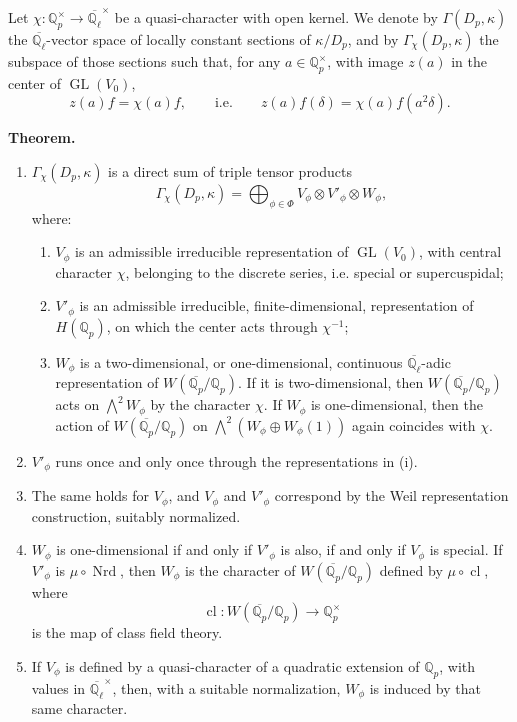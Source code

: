 \documentclass[11pt]{article}
\newcommand{\Qp}{\mathbb{Q}_{p}}
\newcommand{\Ql}{\mathbb{Q}_{\ell}}
\newcommand{\GL}{\operatorname{GL}}
\newcommand{\Nrd}{\operatorname{Nrd}}
\newcommand{\cl}{\operatorname{cl}}
\begin{document}
Let \(\chi:\Qp^\times\to\overline{\Ql}^{\times}\) be a quasi-character with open kernel. We denote by \(\Gamma(D_p,\kappa)\) the \(\overline{\Ql}\)-vector space of locally constant sections of \(\kappa/D_p\), and by \(\Gamma_{\chi}(D_p,\kappa)\) the subspace of those sections such that, for any \(a\in\Qp^\times\), with image \(z(a)\) in the center of \(\GL(V_0)\),
\[
z(a)f=\chi(a)f,\qquad\text{i.e.}\qquad
z(a)f(\delta)=\chi(a)f(a^2\delta).
\]

\textbf{Theorem.}
\begin{enumerate}[label=(\roman*)]
\item \(\Gamma_{\chi}(D_p,\kappa)\) is a direct sum of triple tensor products
\[
\Gamma_{\chi}(D_p,\kappa)=
\bigoplus_{\phi\in\Phi}V_{\phi}\otimes V'_{\phi}\otimes W_{\phi},
\]
where:
\begin{enumerate}[label=(\alph*)]
\item \(V_{\phi}\) is an admissible irreducible representation of \(\GL(V_0)\), with central character \(\chi\), belonging to the discrete series, i.e. special or supercuspidal;
\item \(V'_{\phi}\) is an admissible irreducible, finite-dimensional, representation of \(H(\Qp)\), on which the center acts through \(\chi^{-1}\);
\item \(W_{\phi}\) is a two-dimensional, or one-dimensional, continuous \(\overline{\Ql}\)-adic representation of \(W(\overline{\Qp}/\Qp)\). If it is two-dimensional, then \(W(\overline{\Qp}/\Qp)\) acts on \(\bigwedge^2W_{\phi}\) by the character \(\chi\). If \(W_{\phi}\) is one-dimensional, then the action of \(W(\overline{\Qp}/\Qp)\) on \(\bigwedge^2(W_{\phi}\oplus W_{\phi}(1))\) again coincides with \(\chi\).
\end{enumerate}
\item \(V'_{\phi}\) runs once and only once through the representations in (i).
\item The same holds for \(V_{\phi}\), and \(V_{\phi}\) and \(V'_{\phi}\) correspond by the Weil representation construction, suitably normalized.
\item \(W_{\phi}\) is one-dimensional if and only if \(V'_{\phi}\) is also, if and only if \(V_{\phi}\) is special. If \(V'_{\phi}\) is \(\mu\circ\Nrd\), then \(W_{\phi}\) is the character of \(W(\overline{\Qp}/\Qp)\) defined by \(\mu\circ\cl\), where
\[
\cl:W(\overline{\Qp}/\Qp)\to\Qp^\times
\]
is the map of class field theory.
\item If \(V_{\phi}\) is defined by a quasi-character of a quadratic extension of \(\Qp\), with values in \(\overline{\Ql}^{\times}\), then, with a suitable normalization, \(W_{\phi}\) is induced by that same character.
\end{enumerate}
\end{document}
